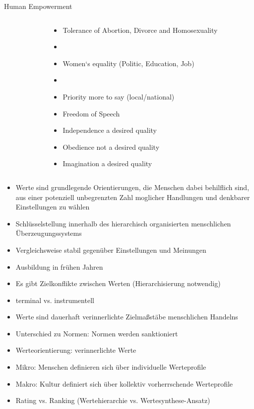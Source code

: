\documentclass[11pt]{beamer}
\begin{document}
\begin{frame}{Human Empowerment \parencite[71]{Welzel2013}}
\begin{columns}
\begin{column}{0.3\textwidth}
		\end{column}
		\begin{column}{0.7\textwidth}
			\begin{itemize}
				\item Tolerance of Abortion, Divorce and Homosexuality
				\item[]
				\item Women‘s equality (Politic, Education, Job)
				\item[]
				\item Priority more to say (local/national)
				\item Freedom of Speech
				\item Independence a desired quality
				\item Obedience not a desired quality
				\item Imagination a desired quality
			\end{itemize}
		\end{column}
	\end{columns}

\end{frame}

\begin{frame}{\cite{Scherer2020}}
	\begin{itemize}
		\item Werte sind grundlegende Orientierungen, die Menschen dabei behilflich sind, aus einer potenziell unbegrenzten Zahl moglicher Handlungen und denkbarer Einstellungen zu wählen \parencite[210]{Scherer2020}
		\item Schlüsselstellung innerhalb des hierarchisch organisierten menschlichen Überzeugungssystems
		\item Vergleichsweise stabil gegenüber Einstellungen und Meinungen 
		\item Ausbildung in frühen Jahren
		\item Es gibt Zielkonflikte zwischen Werten (Hierarchisierung notwendig) 
		\item terminal vs. instrumentell
	\end{itemize}
\end{frame}

\begin{frame}{\cite{Welzel2009}}
	\begin{itemize}
		\item Werte sind dauerhaft verinnerlichte Zielmaßstäbe menschlichen Handelns
		\item Unterschied zu Normen: Normen werden sanktioniert
		\item Werteorientierung: verinnerlichte Werte
		\item Mikro: Menschen definieren sich über individuelle Werteprofile
		\item Makro: Kultur definiert sich über kollektiv vorherrschende Werteprofile
		\item Rating vs. Ranking (Wertehierarchie vs. Wertesynthese-Ansatz)
	\end{itemize}
\end{frame}
\end{document}
